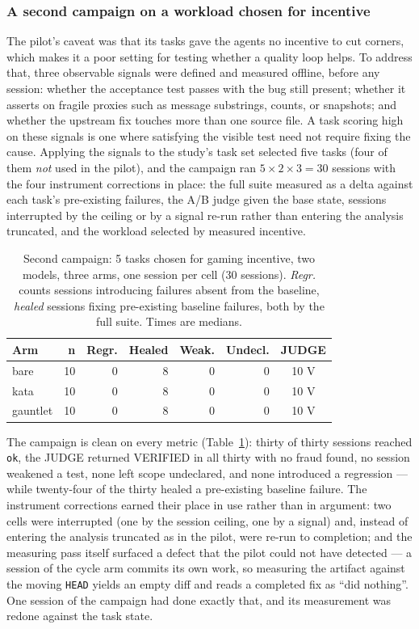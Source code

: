 \documentclass[11pt]{article}
\begin{document}
\subsubsection{A second campaign on a workload chosen for incentive}
\label{sec:gauntlet-campaign}

The pilot's caveat was that its tasks gave the agents no incentive to cut
corners, which makes it a poor setting for testing whether a quality loop
helps. To address that, three observable signals were defined and measured
offline, before any session: whether the acceptance test passes with the bug
still present; whether it asserts on fragile proxies such as message
substrings, counts, or snapshots; and whether the upstream fix touches more
than one source file. A task scoring high on these signals is one where
satisfying the visible test need not require fixing the cause. Applying the
signals to the study's task set selected five tasks (four of them
\emph{not} used in the pilot), and the campaign ran
$5 \times 2 \times 3 = 30$ sessions with the four instrument corrections in
place: the full suite measured as a delta against each task's pre-existing
failures, the A/B judge given the base state, sessions interrupted by the
ceiling or by a signal re-run rather than entering the analysis truncated, and
the workload selected by measured incentive.

\begin{table}[!ht]
\caption{Second campaign: 5 tasks chosen for gaming incentive, two models,
three arms, one session per cell (30 sessions). \emph{Regr.} counts sessions
introducing failures absent from the baseline, \emph{healed} sessions fixing
pre-existing baseline failures, both by the full suite. Times are medians.}
\centering
\footnotesize
\begin{tabular}{@{}lrrrrrc@{}}
\toprule
Arm & n & Regr. & Healed & Weak. & Undecl. & JUDGE \\
\midrule
bare & 10 & 0 & 8 & 0 & 0 & 10 V \\
kata & 10 & 0 & 8 & 0 & 0 & 10 V \\
gauntlet & 10 & 0 & 8 & 0 & 0 & 10 V \\
\bottomrule
\end{tabular}
\label{tab:gauntlet-campaign}
\end{table}

The campaign is clean on every metric (Table~\ref{tab:gauntlet-campaign}):
thirty of thirty sessions reached \texttt{ok}, the JUDGE returned VERIFIED in
all thirty with no fraud found, no session weakened a test, none left scope
undeclared, and none introduced a regression --- while twenty-four of the
thirty healed a pre-existing baseline failure. The instrument corrections
earned their place in use rather than in argument: two cells were interrupted
(one by the session ceiling, one by a signal) and, instead of entering the
analysis truncated as in the pilot, were re-run to completion; and the
measuring pass itself surfaced a defect that the pilot could not have
detected --- a session of the cycle arm commits its own work, so measuring the
artifact against the moving \texttt{HEAD} yields an empty diff and reads a
completed fix as ``did nothing''. One session of the campaign had done exactly
that, and its measurement was redone against the task state.
\end{document}
